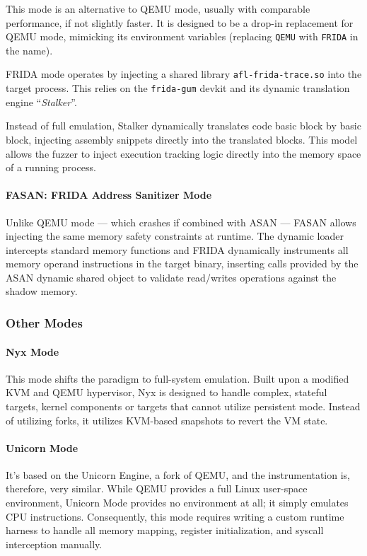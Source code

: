 This mode is an alternative to QEMU mode, usually with comparable performance, if not slightly faster. It is designed to be a drop-in replacement for QEMU mode, mimicking its environment variables (replacing \texttt{QEMU} with \texttt{FRIDA} in the name).

FRIDA mode operates by injecting a shared library \texttt{afl-frida-trace.so} into the target process. This relies on the \texttt{frida-gum} devkit and its dynamic translation engine ``\textit{Stalker}''.

Instead of full emulation, Stalker dynamically translates code basic block by basic block, injecting assembly snippets directly into the translated blocks. This model allows the fuzzer to inject execution tracking logic directly into the memory space of a running process.

\paragraph{FASAN: FRIDA Address Sanitizer Mode} Unlike QEMU mode --- which crashes if combined with ASAN --- FASAN allows injecting the same memory safety constraints at runtime. The dynamic loader intercepts standard memory functions and FRIDA dynamically instruments all memory operand instructions in the target binary, inserting calls provided by the ASAN dynamic shared object to validate read/writes operations against the shadow memory.

\subsubsection{Other Modes}

\paragraph{Nyx Mode} This mode shifts the paradigm to full-system emulation. Built upon a modified KVM and QEMU hypervisor, Nyx is designed to handle complex, stateful targets, kernel components or targets that cannot utilize persistent mode. Instead of utilizing forks, it utilizes KVM-based snapshots to revert the VM state.

\paragraph{Unicorn Mode} It's based on the Unicorn Engine, a fork of QEMU, and the instrumentation is, therefore, very similar. While QEMU provides a full Linux user-space environment, Unicorn Mode provides no environment at all; it simply emulates CPU instructions. Consequently, this mode requires writing a custom runtime harness to handle all memory mapping, register initialization, and syscall interception manually.


